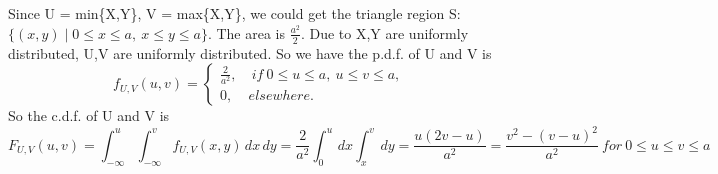 \documentclass[10.5pt]{article}
\begin{document}
\section{}
Since U = min\{X,Y\}, V = max\{X,Y\}, we could get the triangle region S:$\{(x,y)\mid 0\leqslant x \leqslant a,~x\leqslant y \leqslant a\}$. The area is $\frac{a^2}{2}$. Due to X,Y are uniformly distributed, U,V are uniformly distributed. So we have the p.d.f. of U and V is $$f_{U,V}(u,v) = \begin{cases}
    \frac{2}{a^2}, & ~if ~0\leqslant u \leqslant a,~u\leqslant v \leqslant a,\\
    0, & elsewhere.
\end{cases}$$\indent
So the c.d.f. of U and V is $$F_{U,V}(u,v) = \int_{-\infty}^{u}\int_{-\infty}^{v} f_{U,V}(x,y) \,dx \,dy = \frac{2}{a^2} \int_0^u \,dx \int_x^v \,dy = \frac{u(2v-u)}{a^2} = \frac{v^2-(v-u)^2}{a^2} ~for ~0\leqslant u\leqslant v\leqslant a$$
\end{document}
